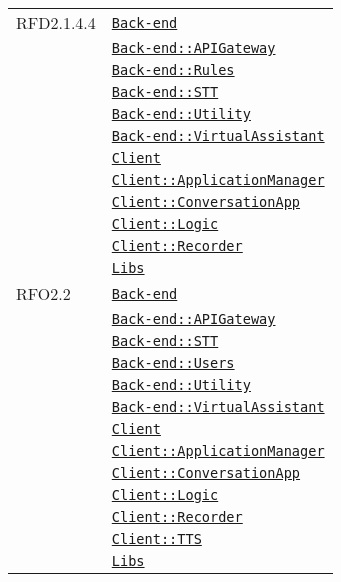 \begin{longtable}{|>{\centering}m{3cm}|m{10cm}<{\centering}|}
RFD2.1.4.4 & \hyperref[Back-end]{\texttt{Back-end}}\\
& \hyperref[Back-end::APIGateway]{\texttt{Back-end::APIGateway}}\\
& \hyperref[Back-end::Rules]{\texttt{Back-end::Rules}}\\
& \hyperref[Back-end::STT]{\texttt{Back-end::STT}}\\
& \hyperref[Back-end::Utility]{\texttt{Back-end::Utility}}\\
& \hyperref[Back-end::VirtualAssistant]{\texttt{Back-end::VirtualAssistant}}\\
& \hyperref[Client]{\texttt{Client}}\\
& \hyperref[Client::ApplicationManager]{\texttt{Client::ApplicationManager}}\\
& \hyperref[Client::ConversationApp]{\texttt{Client::ConversationApp}}\\
& \hyperref[Client::Logic]{\texttt{Client::Logic}}\\
& \hyperref[Client::Recorder]{\texttt{Client::Recorder}}\\
& \hyperref[Libs]{\texttt{Libs}}\\ \hline

RFO2.2 & \hyperref[Back-end]{\texttt{Back-end}}\\
& \hyperref[Back-end::APIGateway]{\texttt{Back-end::APIGateway}}\\
& \hyperref[Back-end::STT]{\texttt{Back-end::STT}}\\
& \hyperref[Back-end::Users]{\texttt{Back-end::Users}}\\
& \hyperref[Back-end::Utility]{\texttt{Back-end::Utility}}\\
& \hyperref[Back-end::VirtualAssistant]{\texttt{Back-end::VirtualAssistant}}\\
& \hyperref[Client]{\texttt{Client}}\\
& \hyperref[Client::ApplicationManager]{\texttt{Client::ApplicationManager}}\\
& \hyperref[Client::ConversationApp]{\texttt{Client::ConversationApp}}\\
& \hyperref[Client::Logic]{\texttt{Client::Logic}}\\
& \hyperref[Client::Recorder]{\texttt{Client::Recorder}}\\
& \hyperref[Client::TTS]{\texttt{Client::TTS}}\\
& \hyperref[Libs]{\texttt{Libs}}\\ \hline


\end{longtable}
